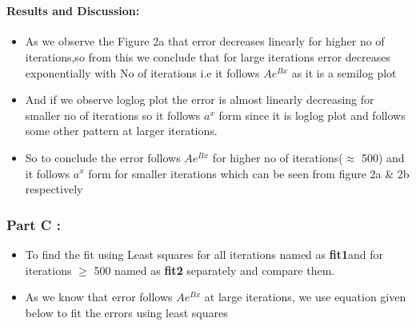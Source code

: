 \documentclass[11pt]{article}
\providecommand{\tightlist}{%
      \setlength{\itemsep}{0pt}\setlength{\parskip}{0pt}}
\begin{document}
	

	

    \begin{center}
    \end{center}
    { \hspace*{\fill} \\}
    
	
		
    \paragraph{Results and Discussion:}\label{results-and-discussion}

\begin{itemize}
\tightlist
\item
  As we observe the Figure 2a that error decreases linearly for higher
  no of iterations,so from this we conclude that for large iterations
  error decreases exponentially with No of iterations i.e it follows
  \(Ae^{Bx}\) as it is a semilog plot
\item
  And if we observe loglog plot the error is almost linearly decreasing
  for smaller no of iterations so it follows \(a^x\) form since it is
  loglog plot and follows some other pattern at larger iterations.
\item
  So to conclude the error follows \(Ae^{Bx}\) for higher no of
  iterations(\(\approx\) 500) and it follows \(a^x\) form for smaller
  iterations which can be seen from figure 2a \& 2b respectively
\end{itemize}

	

	
		
    \subsubsection{Part C :}\label{part-c}

\begin{itemize}
\tightlist
\item
  To find the fit using Least squares for all iterations named as
  \textbf{fit1}and for iterations \(\geq\) 500 named as \textbf{fit2}
  separately and compare them.
\item
  As we know that error follows \(Ae^{Bx}\) at large iterations, we use
  equation given below to fit the errors using least squares
\end{itemize}
\end{document}
